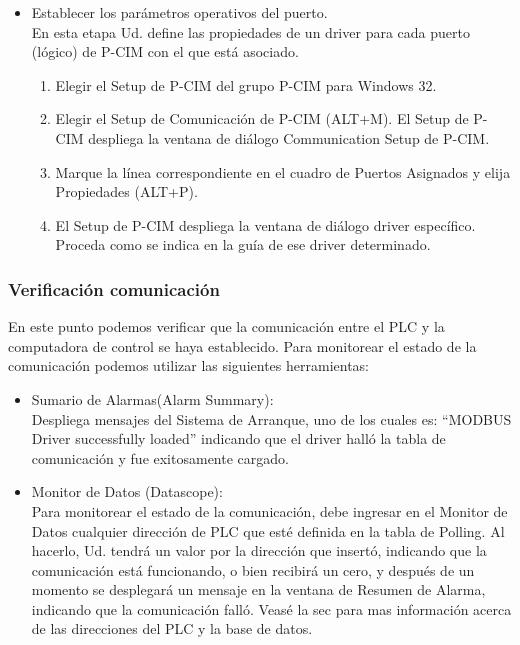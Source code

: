 \begin{itemize}
 \item Establecer los parámetros operativos del puerto.\\
 En esta etapa Ud. define las propiedades de un driver para cada puerto (lógico)
 de P-CIM con el que está asociado.
 \begin{enumerate}
  \item Elegir el Setup de P-CIM del grupo P-CIM para Windows 32.
  \item Elegir el Setup de Comunicación de P-CIM (ALT+M). El Setup de P-CIM
  despliega la ventana de diálogo Communication Setup de P-CIM.
  \item Marque la línea correspondiente en el cuadro de Puertos Asignados y elija
  Propiedades (ALT+P).
  \item El Setup de P-CIM despliega la ventana de diálogo driver específico.
  Proceda como se indica en la guía de ese driver determinado.
 \end{enumerate} 
\end{itemize}

\subsubsection{Verificación comunicación}
En este punto podemos verificar que la comunicación entre el PLC y la
computadora de control se haya establecido. Para monitorear el estado 
de la comunicación podemos utilizar las siguientes herramientas:
\begin{itemize}
 \item Sumario de Alarmas(Alarm Summary):\\
 Despliega mensajes del Sistema de Arranque, uno de los cuales es: “MODBUS
  Driver successfully loaded” indicando que el driver halló la tabla de comunicación y
  fue exitosamente cargado.
 \item Monitor de Datos (Datascope):\\
 Para monitorear el estado de la comunicación,
  debe ingresar en el Monitor de Datos cualquier dirección de PLC que esté definida
  en la tabla de Polling. Al hacerlo, Ud. tendrá un valor por la dirección que insertó,
  indicando que la comunicación está funcionando, o bien recibirá un cero, y
  después de un momento se desplegará un mensaje en la ventana de Resumen
  de Alarma, indicando que la comunicación falló. Veasé la sec
  para mas información acerca de las direcciones del PLC y la base de datos.
\end{itemize}



